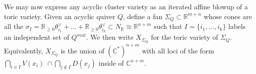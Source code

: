 \documentclass[11pt]{amsart}
\newtheorem{prop}[thm]{Proposition}
\theoremstyle{definition}
\theoremstyle{remark}
\numberwithin{equation}{section}
\begin{document}





We may now express any acyclic cluster variety as an iterated affine blowup of a toric variety. Given an acyclic quiver $Q$, define a fan $\Sigma_Q \subset \mathbb{R}^{m+n}$ whose cones are all the $\sigma_I = \mathbb{R}_{\geq 0} \theta_{i_1}^\vee + ... + \mathbb{R}_{\geq 0} \theta_{i_k}^\vee \subset N_\mathbb{R} \cong \mathbb{R}^{n+m}$ such that $I = \{i_1, ..., i_k\}$ labels an independent set of $Q^{mut}$. We then write $X_{\Sigma_Q}$ for the toric variety of $\Sigma_Q$. Equivalently, $X_{\Sigma_Q}$ is the union of $(\mathbb{C}^*)^{n+m}$ with all loci of the form $\bigcap_{i \in I} V(x_i)\:\cap \bigcap_{j \notin I} D(x_j)$ inside of $\mathbb{C}^{n+m}$.\\
\end{document}
